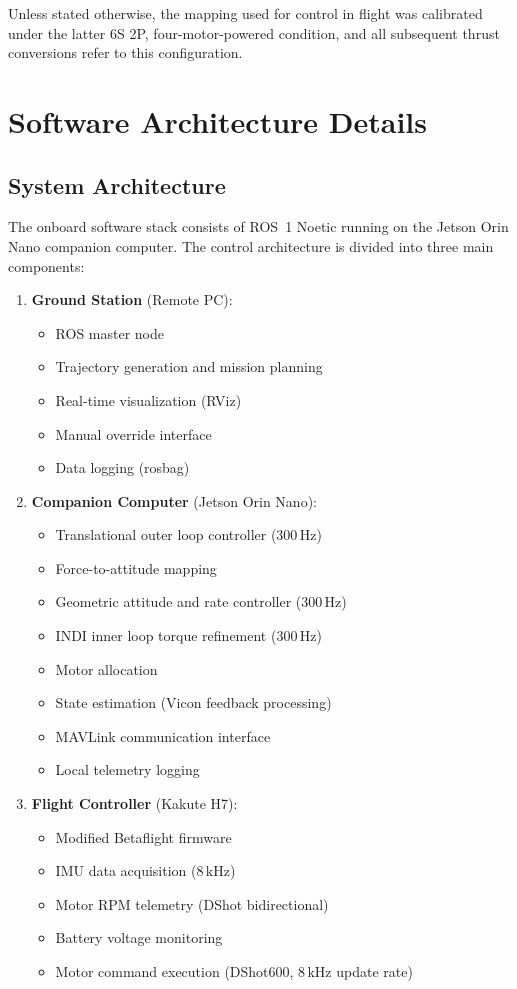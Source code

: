 Unless stated otherwise, the mapping used for control in flight was calibrated under the latter 6S 2P, four-motor-powered condition, and all subsequent thrust conversions refer to this configuration.

\section{Software Architecture Details}\label{sec:software-detailed}

\subsection{System Architecture}

The onboard software stack consists of ROS~1 Noetic running on the Jetson Orin Nano companion computer. The control architecture is divided into three main components:

\begin{enumerate}
\item \textbf{Ground Station} (Remote PC):
\begin{itemize}
\item ROS master node
\item Trajectory generation and mission planning
\item Real-time visualization (RViz)
\item Manual override interface
\item Data logging (rosbag)
\end{itemize}

\item \textbf{Companion Computer} (Jetson Orin Nano):
\begin{itemize}
\item Translational outer loop controller (300\,Hz)
\item Force-to-attitude mapping
\item Geometric attitude and rate controller (300\,Hz)
\item INDI inner loop torque refinement (300\,Hz)
\item Motor allocation
\item State estimation (Vicon feedback processing)
\item MAVLink communication interface
\item Local telemetry logging
\end{itemize}

\item \textbf{Flight Controller} (Kakute H7):
\begin{itemize}
\item Modified Betaflight firmware
\item IMU data acquisition (8\,kHz)
\item Motor RPM telemetry (DShot bidirectional)
\item Battery voltage monitoring
\item Motor command execution (DShot600, 8\,kHz update rate)
\end{itemize}
\end{enumerate}

